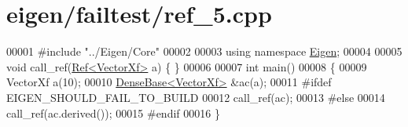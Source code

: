 \hypertarget{eigen_2failtest_2ref__5_8cpp_source}{}\section{eigen/failtest/ref\+\_\+5.cpp}
\label{eigen_2failtest_2ref__5_8cpp_source}

\begin{DoxyCode}
00001 \textcolor{preprocessor}{#include "../Eigen/Core"}
00002 
00003 \textcolor{keyword}{using namespace }\hyperlink{namespace_eigen}{Eigen};
00004 
00005 \textcolor{keywordtype}{void} call\_ref(\hyperlink{group___core___module_class_eigen_1_1_ref}{Ref<VectorXf>} a) \{ \}
00006 
00007 \textcolor{keywordtype}{int} main()
00008 \{
00009   VectorXf a(10);
00010   \hyperlink{group___core___module_class_eigen_1_1_dense_base}{DenseBase<VectorXf>} &ac(a);
00011 \textcolor{preprocessor}{#ifdef EIGEN\_SHOULD\_FAIL\_TO\_BUILD}
00012   call\_ref(ac);
00013 \textcolor{preprocessor}{#else}
00014   call\_ref(ac.derived());
00015 \textcolor{preprocessor}{#endif}
00016 \}
\end{DoxyCode}
